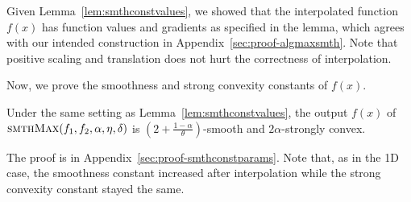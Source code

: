 Given Lemma~\ref{lem:smthconstvalues}, we showed that the interpolated function
$f(x)$ has function values and gradients as specified in the lemma,
which agrees with our intended construction in Appendix~\ref{sec:proof-algmaxsmth}.
Note that positive scaling and translation does not hurt the correctness of interpolation.

Now, we prove the smoothness and strong convexity constants of $f(x)$.
\begin{lemma}
	\label{lem:smthconstparams}
	Under the same setting as Lemma~\ref{lem:smthconstvalues},
	the output $f(x)$ of $\textsc{smthMax}(f_{1}, f_{2}, \alpha, \eta, \delta)$ is $\left (2+\frac{1-\alpha}{\theta}\right )$-smooth and $2\alpha$-strongly convex.
\end{lemma}
The proof is in Appendix~\ref{sec:proof-smthconstparams}. 
Note that, as in the 1D case, the smoothness constant increased after interpolation while the strong convexity constant stayed the same.


